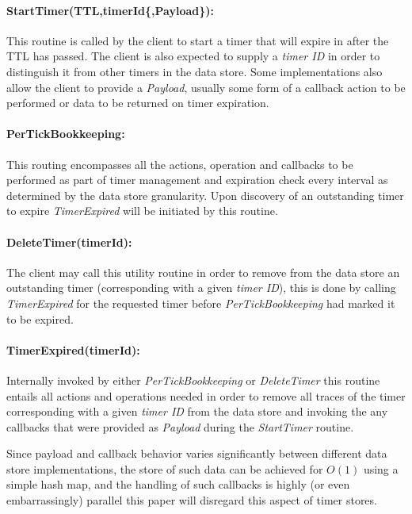\documentclass[twocolumn,a4paper]{article}
\begin{document}
\paragraph{StartTimer(TTL,timerId\{,Payload\}):} This routine is called by the client to start a timer that will expire in after the TTL has passed. The client is also expected to supply a \textit{timer ID} in order to distinguish it from other timers in the data store. Some implementations also allow the client to provide a \textit{Payload}, usually some form of a callback action to be performed or data to be returned on timer expiration.

\paragraph{PerTickBookkeeping:} This routing encompasses all the actions, operation and callbacks to be performed as part of timer management and  expiration check every interval as determined by the data store granularity. Upon discovery of an outstanding timer to expire \textit{TimerExpired} will be initiated by this routine.

\paragraph{DeleteTimer(timerId):} The client may call this utility routine in order to remove from the data store an outstanding timer (corresponding with a given \textit{timer ID}), this is done by calling \textit{TimerExpired} for the requested timer before \textit{PerTickBookkeeping} had marked it to be expired.

\paragraph{TimerExpired(timerId):} Internally invoked by either \textit{PerTickBookkeeping} or \textit{DeleteTimer} this routine entails all actions and operations needed in order to remove all traces of the timer corresponding with a given \textit{timer ID} from the data store and invoking the any callbacks that were provided as \textit{Payload} during the \textit{StartTimer} routine.

\vspace{5mm}

 Since payload and callback behavior varies significantly between different data store implementations, the store of such data can be achieved for $ O(1) $ using a simple hash map, and the handling of such callbacks is highly (or even embarrassingly) parallel this paper will disregard this aspect of timer stores.
\end{document}
